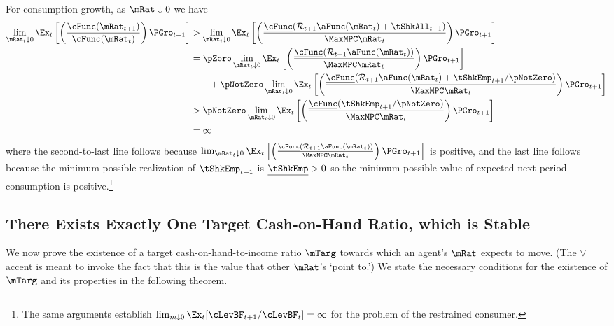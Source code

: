 \documentclass[BufferStockTheory]{subfiles}
\begin{document}
For consumption growth, as $\mRat \downarrow 0$ we have
\begin{align*}
  \lim_{\mRat_{t} \downarrow 0} \Ex_{t}\left[\left(\frac{\cFunc({\mRat}_{t+1})}{\cFunc(\mRat_t)}\right){\PGro}_{t+1}\right]
  & > \lim_{\mRat_{t} \downarrow 0} \Ex_{t}\left[\left(\frac{\ushort{\cFunc}({\mathcal{\mathcal{R}}}_{t+1}\aFunc(\mRat_{t})+{%
    \tShkAll}_{t+1})}{\MaxMPC \mRat_{t}}\right){\PGro}_{t+1}\right]  \notag \\
  & = \pZero \lim_{\mRat_{t} \downarrow 0} \Ex_{t}\left[\left(\frac{\ushort{\cFunc}({\mathcal{\mathcal{R}}}_{t+1}\aFunc(\mRat_{t}))}{\MaxMPC \mRat_{t}}\right){\PGro}_{t+1}\right] \\
  & ~~~~~~ + \pNotZero \lim_{\mRat_{t} \downarrow 0}  \Ex_{t}\left[\left(\frac{\ushort{\cFunc}({\mathcal{\mathcal{R}}}_{t+1}\aFunc(\mRat_{t})+
    \tShkEmp_{t+1}/\pNotZero)}{\MaxMPC \mRat_{t}}\right){\PGro}_{t+1}\right]  \\\notag
  & > \pNotZero \lim_{\mRat_{t} \downarrow 0} \Ex_{t}\left[\left(\frac{\ushort{\cFunc}(
    \tShkEmp_{t+1}/\pNotZero)}{\MaxMPC \mRat_{t}}\right){\PGro}_{t+1}\right] \\
  & = \infty \nonumber
\end{align*}
where the second-to-last line follows because  $\lim_{\mRat_{t} \downarrow 0} \Ex_{t}\left[\left(\frac{\ushort{\cFunc}({\mathcal{\mathcal{R}}}_{t+1}\aFunc(\mRat_{t}))}{\MaxMPC \mRat_{t}}\right){\PGro}_{t+1}\right]$ is positive, and the last line follows because the minimum possible realization of $\tShkEmp_{t+1}$ is $\ushort{\tShkEmp}>0$ so the minimum possible value of expected next-period consumption is positive.\footnote{
  The same arguments establish $\lim_{m \downarrow 0} \Ex_{t}[\cLevBF_{t+1}/\cLevBF_{t}] = \infty$
  for the problem of the restrained consumer.%
}

\hypertarget{onetarget}{}

\subsection{There Exists Exactly One Target Cash-on-Hand Ratio,
  which is Stable}

\label{subsec:onetarget}
\hypertarget{TheoremTarget}{}

We now prove the existence of a target cash-on-hand-to-income ratio $\mTarg$ towards which an agent's $\mRat$ expects to move. (The $\vee$ accent is meant to invoke the fact that this is the value that other $\mRat$'s `point to.') We state the necessary conditions for the existence of $\mTarg$ and its properties in the following theorem.
\end{document}
